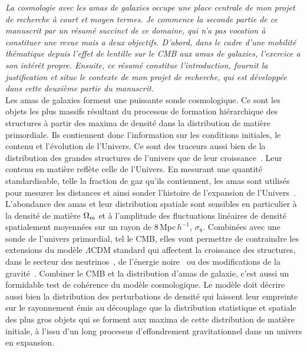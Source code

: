 
%
%
%
%
%                 
%
%
%

\emph{La cosmologie avec les amas de galaxies occupe une place centrale de
mon projet de recherche à court et moyen termes. Je commence la
seconde partie de ce manuscrit par un résumé succinct de ce domaine,
qui n'a pas vocation à constituer une revue mais a deux
objectifs. D'abord, dans le cadre d'une mobilité thématique depuis
l'effet de lentille sur le CMB aux amas de galaxies, l'exercice a son
intérêt propre. Ensuite, ce résumé constitue l'introduction, fournit
la justification et situe le contexte de mon projet de recherche, qui
est développée dans cette deuxième partie du manuscrit.}\\


Les amas de galaxies forment une puissante sonde cosmologique.
Ce sont les objets les plus massifs résultant du processus de formation
hiérarchique des structures à partir des maxima de
densité dans la distribution de matière primordiale. Ils contiennent
donc l'information sur les conditions initiales, le contenu et
l'évolution de l'Univers. Ce sont des traceurs aussi bien de la
distribution des grandes structures de l'univers que de leur
croissance~\citep[pour une revue]{Allen2011}. Leur contenu en matière
reflète celle de l'Univers. En mesurant une quantité
standardisable, telle la fraction de gaz qu'ils contiennent, les amas
sont utilisés pour mesurer les distances et ainsi sonder
l'histoire de l'expansion de l'Univers~\citep{Sasaki1996, Allen2008,
Ettori2009}.
L'abondance des amas et leur distribution spatiale sont sensibles en
particulier à la densité de matière $\Omega_{\rm{m}}$ et à l'amplitude
des fluctuations linéaires de densité spatialement moyennées sur un
rayon de 8\,Mpc\,$h^{-1}$, $\sigma_8$. Combinées
avec une sonde de l'univers primordial, tel le CMB, elles vont
permettre de contraindre les extensions du modèle
$\Lambda$CDM standard qui affectent la croissance des structures, dans
le secteur des neutrinos~\citep{Wang2005, Bolliet2019}, de l'énergie
noire~\citep{Haiman2001} ou des modifications de la
gravité~\citep{Mohr2003, Hagstotz2019}. Combiner le CMB et
la distribution d'amas de galaxie,
c'est aussi un formidable test de cohérence du modèle cosmologique.
Le modèle doit décrire aussi bien la distribution des perturbations de
densité qui laissent leur empreinte sur le rayonnement émis au
découplage que la distribution statistique et spatiale des plus gros
objets qui se forment aux maxima de cette distribution de matière
initiale, à l'issu d'un long processus d'effondrement gravitationnel
dans un univers en expansion. 

